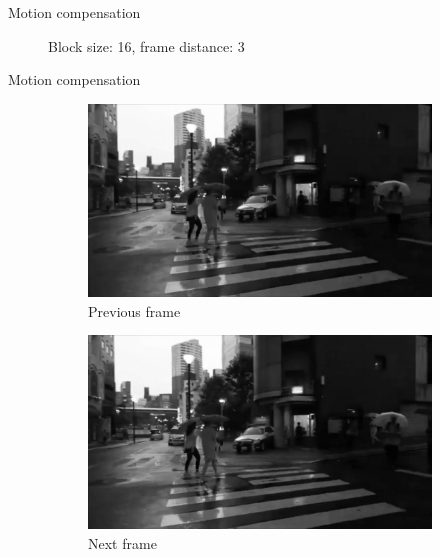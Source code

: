 \documentclass[aspectratio=1610,xcolor=dvipsnames]{beamer}
\begin{document}
\begin{frame}{Motion compensation}
\begin{figure}[htbp]
        \caption{Block size: 16, frame distance: 3}
    \end{figure}
\end{frame}

\begin{frame}{Motion compensation}
    \begin{figure}[htbp]
        \begin{subfigure}[b]{0.3\textwidth}
            \centering
            \includegraphics[width=\textwidth]{images/tokyo-previous.png}
            \caption{Previous frame}
            \label{fig:tokyo-prev-frame}
        \end{subfigure}
        \hfill
        \begin{subfigure}[b]{0.3\textwidth}
            \includegraphics[width=\textwidth]{images/tokyo-current.png}
            \caption{Next frame}
            \label{fig:tokyo-curr-frame}
        \end{subfigure}
        \hfill
        \begin{subfigure}[b]{0.3\textwidth}

\end{subfigure}
\end{figure}
\end{frame}
\end{document}
